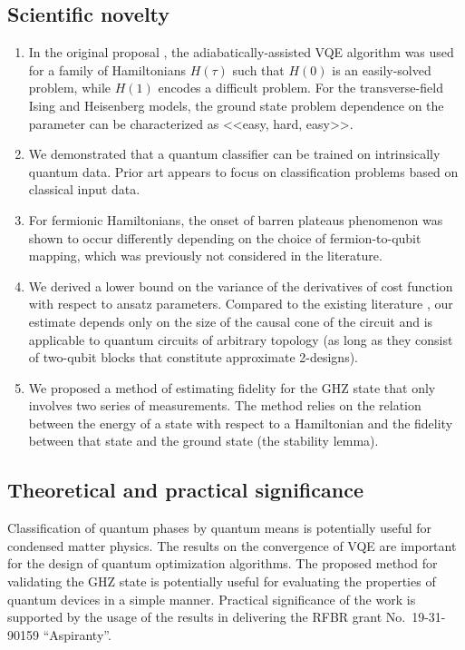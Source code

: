 \subsection*{Scientific novelty}
\begin{enumerate}
    \item In the original proposal \cite{garcia-saez_addressing_2018}, the adiabatically-assisted VQE algorithm was used for a family of Hamiltonians $H(\tau)$ such that $H(0)$ is an easily-solved problem, while $H(1)$ encodes a difficult problem. For the transverse-field Ising and Heisenberg models, the ground state problem dependence on the parameter can be characterized as <<easy, hard, easy>>. 
    \item We demonstrated that a quantum classifier can be trained on intrinsically quantum data. Prior art appears to focus on classification problems based on classical input data.    
    \item For fermionic Hamiltonians, the onset of barren plateaus phenomenon was shown to occur differently depending on the choice of fermion-to-qubit mapping, which was previously not considered in the literature.
    \item We derived a lower bound on the variance of the derivatives of cost function with respect to ansatz parameters. Compared to the existing literature \cite{mcclean_barren_2018,cerezo_cost-function-dependent_2020}, our estimate depends only on the size of the causal cone of the circuit and is applicable to quantum circuits of arbitrary topology (as long as they consist of two-qubit blocks that constitute approximate 2-designs).
    \item We proposed a method of estimating fidelity for the GHZ state that only involves two series of measurements. The method relies on the relation between the energy of a state with respect to a Hamiltonian and the fidelity between that state and the ground state (the stability lemma).
\end{enumerate}

\subsection*{Theoretical and practical significance} Classification of quantum phases by quantum means is potentially useful for condensed matter physics. The results on the convergence of VQE are important for the design of quantum optimization algorithms. The proposed method for validating the GHZ state is potentially useful for evaluating the properties of quantum devices in a simple manner.
Practical significance of the work is supported by the usage of the results in delivering the RFBR grant No.\ 19-31-90159 ``Aspiranty''.


